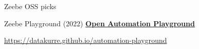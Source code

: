 \documentclass[12pt,aspectratio=169]{beamer}
\begin{document}
\begin{frame}{Zeebe OSS picks}
\begin{minipage}{0.45\textwidth}
\end{minipage}
\end{frame}

\begin{frame}{Zeebe Playground (2022)}
\centering
\textbf{\href{https://datakurre.github.io/automation-playground}{Open Automation Playground}}
\par
{\href{https://datakurre.github.io/automation-playground}{https://datakurre.github.io/automation-playground}}
\end{frame}
\end{document}
